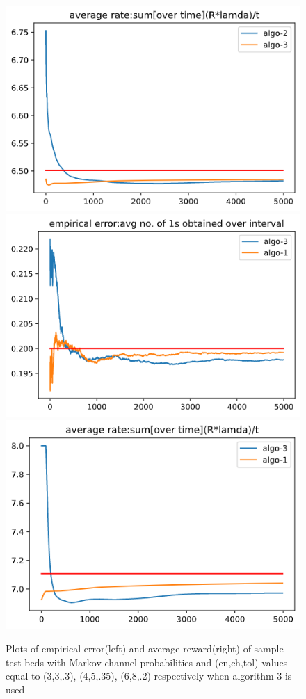 \documentclass[BTech,thesis]{iitmdiss}
\begin{document}
\begin{figure}[H]
\begin{center}
      \includegraphics[scale=0.4]{45-m-rate.png}
      \includegraphics[scale=0.4]{68-m-err.png}
      \includegraphics[scale=0.4]{68-m-rate.png}
      \caption {Plots of empirical error(left) and average reward(right) of sample test-beds with Markov channel probabilities and (en,ch,tol) values equal to (3,3,.3), (4,5,.35), (6,8,.2) respectively when algorithm 3 is used}
    \label{fig:m}
    \end{center}
 \end{figure}
\end{document}
